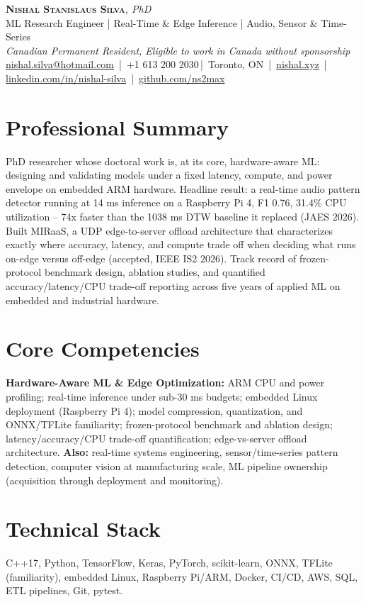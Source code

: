 \documentclass[11pt]{article}
\makeatletter
\newcommand{\cvName}{Nishal Stanislaus Silva}
\newcommand{\cvEmail}{nishal.silva@hotmail.com}
\newcommand{\cvPhone}{+1 613 200 2030}
\newcommand{\cvCity}{Toronto, ON}
\newcommand{\cvSite}{https://nishal.xyz}
\newcommand{\cvLinkedIn}{https://www.linkedin.com/in/nishal-silva}
\newcommand{\cvGitHub}{https://github.com/ns2max}
\newcommand{\cvStatus}{Canadian Permanent Resident, Eligible to work in Canada without sponsorship}
\newcommand{\cvTagline}{ML Research Engineer | Real-Time \& Edge Inference | Audio, Sensor \& Time-Series}
\makeatother
\begin{document}
\pagestyle{empty}
\begin{center}
    {\LARGE \scshape \textbf{\cvName}}{\large \textit{, PhD}}\\[1pt]
    {\small \cvTagline}\\[1pt]
    {\footnotesize\textit{\cvStatus}}\\[1pt]
    {\small
    \href{mailto:\cvEmail}{\cvEmail} \,|\, \cvPhone \,|\, \cvCity
    \,|\, \href{\cvSite}{nishal.xyz} \,|\, \href{\cvLinkedIn}{linkedin.com/in/nishal-silva}
    \,|\, \href{\cvGitHub}{github.com/ns2max}}
\end{center}

\section*{Professional Summary}
PhD researcher whose doctoral work is, at its core, hardware-aware ML: designing and validating models under a fixed latency, compute, and power envelope on embedded ARM hardware. Headline result: a real-time audio pattern detector running at 14 ms inference on a Raspberry Pi 4, F1 0.76, 31.4\% CPU utilization -- 74x faster than the 1038 ms DTW baseline it replaced (JAES 2026). Built MIRaaS, a UDP edge-to-server offload architecture that characterizes exactly where accuracy, latency, and compute trade off when deciding what runs on-edge versus off-edge (accepted, IEEE IS2 2026). Track record of frozen-protocol benchmark design, ablation studies, and quantified accuracy/latency/CPU trade-off reporting across five years of applied ML on embedded and industrial hardware.

\section*{Core Competencies}
\textbf{Hardware-Aware ML \& Edge Optimization:} ARM CPU and power profiling; real-time inference under sub-30 ms budgets; embedded Linux deployment (Raspberry Pi 4); model compression, quantization, and ONNX/TFLite familiarity; frozen-protocol benchmark and ablation design; latency/accuracy/CPU trade-off quantification; edge-vs-server offload architecture. \textbf{Also:} real-time systems engineering, sensor/time-series pattern detection, computer vision at manufacturing scale, ML pipeline ownership (acquisition through deployment and monitoring).

\section*{Technical Stack}
C++17, Python, TensorFlow, Keras, PyTorch, scikit-learn, ONNX, TFLite (familiarity), embedded Linux, Raspberry Pi/ARM, Docker, CI/CD, AWS, SQL, ETL pipelines, Git, pytest.
\end{document}
